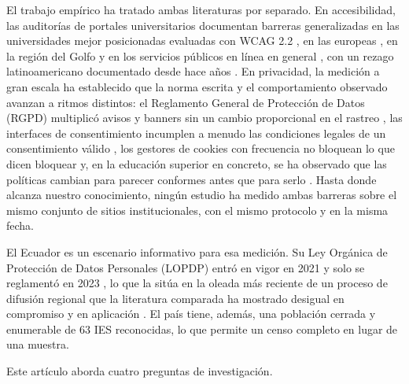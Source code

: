 \documentclass[pdflatex,sn-basic,Numbered]{sn-jnl}
\theoremstyle{thmstyleone}
\theoremstyle{thmstyletwo}
\theoremstyle{thmstylethree}
\begin{document}
El trabajo emp\'irico ha tratado ambas literaturas por separado. En accesibilidad, las auditor\'ias de portales universitarios documentan barreras generalizadas en las universidades mejor posicionadas evaluadas con WCAG 2.2 \citep{krittika2025accessibility}, en las europeas \citep{krejtz2025higher}, en la regi\'on del Golfo \citep{fakrudeen2025evaluation} y en los servicios p\'ublicos en l\'inea en general \citep{aljedaani2025egovernment,iniesto2025service}, con un rezago latinoamericano documentado desde hace a\~nos \citep{campoverdemolina2023accessibility,acostavargas2020dataset}. En privacidad, la medici\'on a gran escala ha establecido que la norma escrita y el comportamiento observado avanzan a ritmos distintos: el Reglamento General de Protecci\'on de Datos (RGPD) \citep{gdpr2016} multiplic\'o avisos y banners sin un cambio proporcional en el rastreo \citep{degeling2019value,trevisan2019four,kretschmer2021cookie}, las interfaces de consentimiento incumplen a menudo las condiciones legales de un consentimiento v\'alido \citep{matte2020cookie,nouwens2020dark,gray2021dark,habib2022okay}, los gestores de cookies con frecuencia no bloquean lo que dicen bloquear \citep{sanchezrola2019can,bollinger2022automating} y, en la educaci\'on superior en concreto, se ha observado que las pol\'iticas cambian para parecer conformes antes que para serlo \citep{munot2025compliance}. Hasta donde alcanza nuestro conocimiento, ning\'un estudio ha medido ambas barreras sobre el mismo conjunto de sitios institucionales, con el mismo protocolo y en la misma fecha.

El Ecuador es un escenario informativo para esa medici\'on. Su Ley Org\'anica de Protecci\'on de Datos Personales (LOPDP) entr\'o en vigor en 2021 y solo se reglament\'o en 2023 \citep{lopdp2021,reglamentolopdp2023}, lo que la sit\'ua en la oleada m\'as reciente de un proceso de difusi\'on regional que la literatura comparada ha mostrado desigual en compromiso y en aplicaci\'on \citep{carrillo2022follow,chavarriamora2025lack}. El pa\'is tiene, adem\'as, una poblaci\'on cerrada y enumerable de 63 IES reconocidas, lo que permite un censo completo en lugar de una muestra.

Este art\'iculo aborda cuatro preguntas de investigaci\'on.
\end{document}
